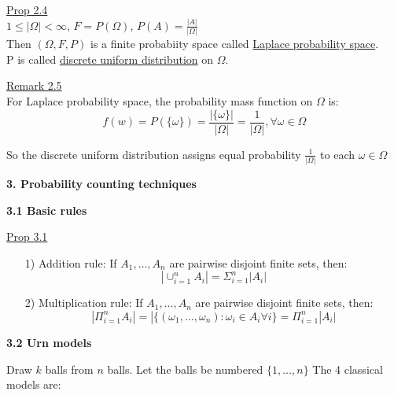\documentclass[10pt,letterpaper]{article}
\begin{document}
\underline{Prop 2.4}\\

$1\leq |\Omega| <\infty$, $F=P(\Omega)$, $P(A) = \frac{|A|}{|\Omega|}$\\

Then $(\Omega, F, P)$ is a finite probabiity space called \underline{Laplace probability space}.\\

P is called \underline{discrete uniform distribution} on $\Omega$.

\underline{Remark 2.5}\\

For Laplace probability space, the probability mass function on $\Omega$ is:
$$f(w)=P(\{\omega\})=\frac{|\{\omega\}|}{|\Omega|}=\frac{1}{|\Omega|},\forall\omega\in\Omega$$

So the discrete uniform distribution assigns equal probability $\frac{1}{|\Omega|}$
to each $\omega\in\Omega$

\pagebreak

\begin{center}
\textbf{3. Probability counting techniques}
\end{center}

\textbf{3.1 Basic rules}

\underline{Prop 3.1}\\

\begin{enumerate}
\item[1)] Addition rule: If $A_1,\dots,A_n$ are pairwise disjoint finite sets, then:
$$|\cup_{i=1}^nA_i|=\Sigma_{i=1}^{n}|A_i|$$

\item[2)] Multiplication rule: If $A_1,\dots,A_n$ are pairwise disjoint finite sets, then:
$$|\Pi_{i=1}^nA_i|=|\{(\omega_1,\dots,\omega_n):\omega_i\in A_i\forall i\}=\Pi_{i=1}^n|A_i|$$

\end{enumerate}

\textbf{3.2 Urn models}

Draw $k$ balls from $n$ balls. Let the balls be numbered $\{1,\dots,n\}$ The 4 classical models are:
\end{document}
